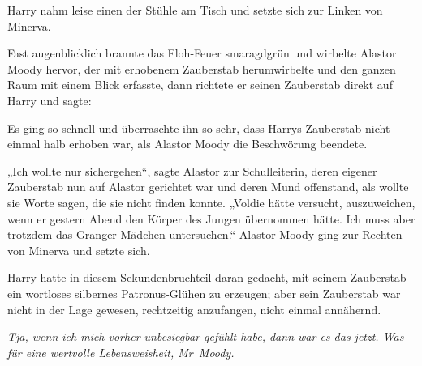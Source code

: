 Harry nahm leise einen der Stühle am Tisch und setzte sich zur Linken von Minerva.

Fast augenblicklich brannte das Floh-Feuer smaragdgrün und wirbelte Alastor Moody hervor, der mit erhobenem Zauberstab herumwirbelte und den ganzen Raum mit einem Blick erfasste, dann richtete er seinen Zauberstab direkt auf Harry und sagte: 

Es ging so schnell und überraschte ihn so sehr, dass Harrys Zauberstab nicht einmal halb erhoben war, als Alastor Moody die Beschwörung beendete.

„Ich wollte nur sichergehen“, sagte Alastor zur Schulleiterin, deren eigener Zauberstab nun auf Alastor gerichtet war und deren Mund offenstand, als wollte sie Worte sagen, die sie nicht finden konnte.
„Voldie hätte versucht, auszuweichen, wenn er gestern Abend den Körper des Jungen übernommen hätte. Ich muss aber trotzdem das Granger-Mädchen untersuchen.“
Alastor Moody ging zur Rechten von Minerva und setzte sich.

Harry hatte in diesem Sekundenbruchteil daran gedacht, mit seinem Zauberstab ein wortloses silbernes Patronus-Glühen zu erzeugen; aber sein Zauberstab war nicht in der Lage gewesen, rechtzeitig anzufangen, nicht einmal annähernd.

\emph{Tja, wenn ich mich vorher unbesiegbar gefühlt habe, dann war es das jetzt. Was für eine wertvolle Lebensweisheit, Mr~Moody.}

